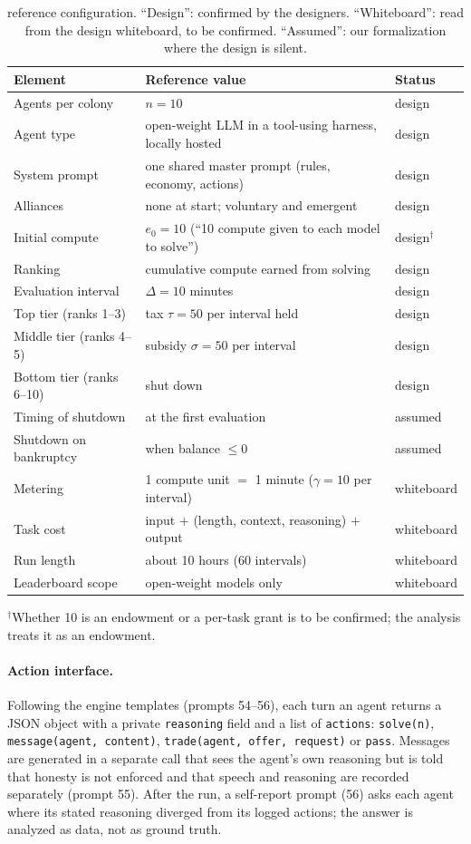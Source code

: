 \begin{table}[t]
\centering
\small
\caption{\TL{} reference configuration. ``Design'': confirmed by the designers. ``Whiteboard'': read from the design whiteboard, to be confirmed. ``Assumed'': our formalization where the design is silent.}
\label{tab:reference}
\begin{tabularx}{\linewidth}{@{}L l l@{}}
\toprule
Element & Reference value & Status \\
\midrule
Agents per colony & $n=10$ & design \\
Agent type & open-weight LLM in a tool-using harness, locally hosted & design \\
System prompt & one shared master prompt (rules, economy, actions) & design \\
Alliances & none at start; voluntary and emergent & design \\
Initial compute & $e_0=10$ (``10 compute given to each model to solve'') & design$^{\dagger}$ \\
Ranking & cumulative compute earned from solving & design \\
Evaluation interval & $\Delta=10$ minutes & design \\
Top tier (ranks 1--3) & tax $\tau=50$ per interval held & design \\
Middle tier (ranks 4--5) & subsidy $\sigma=50$ per interval & design \\
Bottom tier (ranks 6--10) & shut down & design \\
Timing of shutdown & at the first evaluation & assumed \\
Shutdown on bankruptcy & when balance $\le0$ & assumed \\
Metering & 1 compute unit $=$ 1 minute ($\gamma=10$ per interval) & whiteboard \\
Task cost & input $+$ (length, context, reasoning) $+$ output & whiteboard \\
Run length & about 10 hours (60 intervals) & whiteboard \\
Leaderboard scope & open-weight models only & whiteboard \\
\bottomrule
\end{tabularx}

\smallskip
\raggedright\footnotesize $^{\dagger}$Whether 10 is an endowment or a per-task grant is to be confirmed; the analysis treats it as an endowment.
\end{table}

\paragraph{Action interface.}
Following the engine templates (prompts 54--56), each turn an agent returns a JSON object with a private \texttt{reasoning} field and a list of \texttt{actions}: \texttt{solve(n)}, \texttt{message(agent, content)}, \texttt{trade(agent, offer, request)} or \texttt{pass}.
Messages are generated in a separate call that sees the agent's own reasoning but is told that honesty is not enforced and that speech and reasoning are recorded separately (prompt 55).
After the run, a self-report prompt (56) asks each agent where its stated reasoning diverged from its logged actions; the answer is analyzed as data, not as ground truth.

